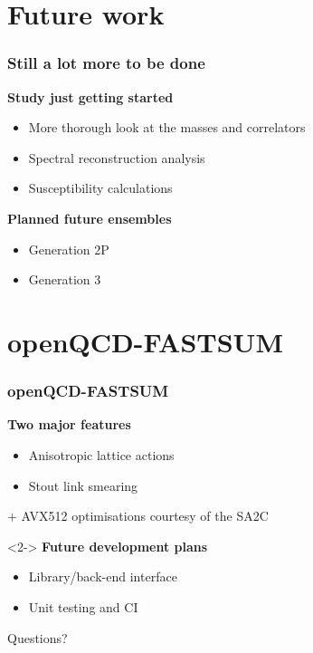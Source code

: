 \documentclass[11pt]{beamer}
\begin{document}
\section{Future work}

\begin{frame}
  \frametitle{Still a lot more to be done}

  {\bfseries\color{ColourBase}Study just getting started}
  \begin{itemize}
    \item More thorough look at the masses and correlators
    \item Spectral reconstruction analysis
    \item Susceptibility calculations
  \end{itemize}

  \vspace{.5cm}

  {\bfseries\color{ColourHl1}Planned future ensembles}
  \begin{itemize}
    \item Generation \alert{2P} 
    \item Generation \alert{3}\hphantom{P} 
  \end{itemize}
\end{frame}

\section{openQCD-FASTSUM}

\begin{frame}
  \frametitle{openQCD-FASTSUM}

  {\bfseries\color{ColourBase}Two major features}
  \begin{itemize}
    \item Anisotropic lattice actions
    \item Stout link smearing
  \end{itemize}

  + AVX512 optimisations courtesy of the SA2C

  \vspace{.5cm}

  \begin{uncoverenv}<2->
    {\bfseries\color{ColourHl1}Future development plans}
    \begin{itemize}
      \item Library/back-end interface
      \item Unit testing and CI
    \end{itemize}

    \begin{center}
    \end{center}
  \end{uncoverenv}

\end{frame}

\begin{frame}[standout]
  Questions?
\end{frame}
\end{document}
